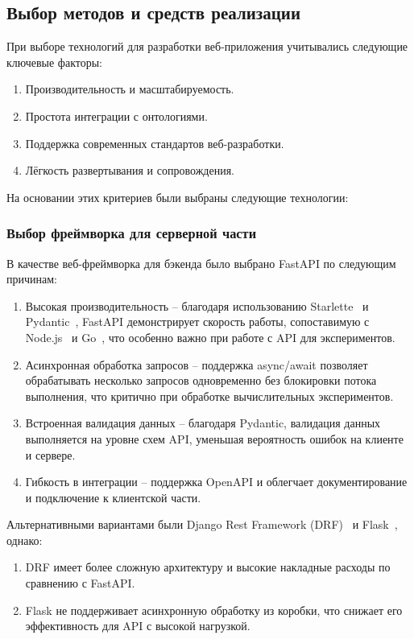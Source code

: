 \subsection{Выбор методов и средств реализации}

При выборе технологий для разработки веб-приложения учитывались следующие ключевые факторы:
\begin{enumerate}
    \item Производительность и масштабируемость.
    \item Простота интеграции с онтологиями.
    \item Поддержка современных стандартов веб-разработки.
    \item Лёгкость развертывания и сопровождения.
\end{enumerate}

На основании этих критериев были выбраны следующие технологии:

\subsubsection{Выбор фреймворка для серверной части}

В качестве веб-фреймворка для бэкенда было выбрано FastAPI по следующим причинам:
\begin{enumerate}
    \item Высокая производительность -- благодаря использованию Starlette~\cite{Framework:Starlette} и Pydantic~\cite{Library:Pydantic}, FastAPI демонстрирует скорость работы, сопоставимую с Node.js~\cite{Lang:NodeJS} и Go~\cite{Lang:Go}, что особенно важно при работе с API для экспериментов.
    \item Асинхронная обработка запросов -- поддержка async/await позволяет обрабатывать несколько запросов одновременно без блокировки потока выполнения, что критично при обработке вычислительных экспериментов.
    \item Встроенная валидация данных -- благодаря Pydantic, валидация данных выполняется на уровне схем API, уменьшая вероятность ошибок на клиенте и сервере.
    \item Гибкость в интеграции -- поддержка OpenAPI и облегчает документирование и подключение к клиентской части.
\end{enumerate}

Альтернативными вариантами были Django Rest Framework (DRF)~\cite{Framework:DRF} и Flask~\cite{Framework:Flask}, однако:
\begin{enumerate}
    \item DRF имеет более сложную архитектуру и высокие накладные расходы по сравнению с FastAPI.
    \item Flask не поддерживает асинхронную обработку из коробки, что снижает его эффективность для API с высокой нагрузкой.
\end{enumerate}

